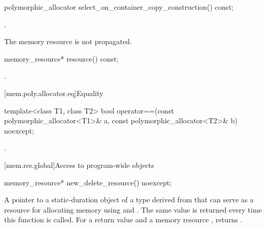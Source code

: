%
\begin{itemdecl}
polymorphic_allocator select_on_container_copy_construction() const;
\end{itemdecl}

\begin{itemdescr}
\pnum
\returns
{}.

\pnum
\begin{note}
The memory resource is not propagated.
\end{note}
\end{itemdescr}

%
\begin{itemdecl}
memory_resource* resource() const;
\end{itemdecl}

\begin{itemdescr}
\pnum
\returns
{}.
\end{itemdescr}

[mem.poly.allocator.eq]{Equality}

%
\begin{itemdecl}
template<class T1, class T2>
  bool operator==(const polymorphic_allocator<T1>& a,
                  const polymorphic_allocator<T2>& b) noexcept;
\end{itemdecl}

\begin{itemdescr}
\pnum
\returns
{}.
\end{itemdescr}

[mem.res.global]{Access to program-wide  objects}

%
\begin{itemdecl}
memory_resource* new_delete_resource() noexcept;
\end{itemdecl}

\begin{itemdescr}
\pnum
\returns
A pointer to a static-duration object of a type derived from 
that can serve as a resource for allocating memory
using  and .
The same value is returned every time this function is called.
For a return value  and a memory resource ,
 returns .
\end{itemdescr}

